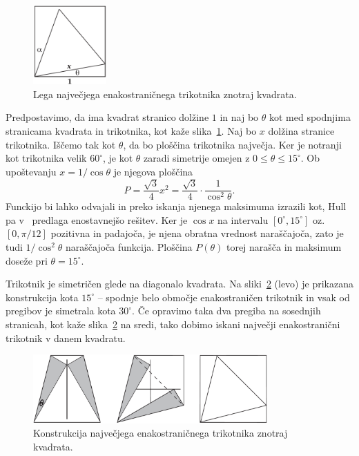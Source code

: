 \begin{figure}[h]
    \centering
    \includegraphics[width=0.25\textwidth]{images/n-kotniki/trik_enak_max1.png}
    \caption[Lega največjega enakostraničnega trikotnika znotraj kvadrata]{Lega največjega enakostraničnega trikotnika znotraj kvadrata.}
    \label{fig:trik_enak_max1}
\end{figure}

Predpostavimo, da ima kvadrat stranico dolžine $1$ in naj bo $\theta$ kot med spodnjima stranicama kvadrata in trikotnika, kot kaže slika~\ref{fig:trik_enak_max1}. Naj bo $x$ dolžina stranice trikotnika. Iščemo tak kot $\theta$, da bo ploščina trikotnika največja. Ker je notranji kot trikotnika velik $60^\circ$, je kot $\theta$ zaradi simetrije omejen z $0 \leq \theta \leq 15^\circ$. Ob upoštevanju $x = 1/ \cos \theta$ je njegova ploščina
$$ P = \frac{\sqrt{3}}{4} x^2 = \frac{\sqrt{3}}{4} \cdot \frac{1}{\cos^2 \theta}. $$
Funckijo bi lahko odvajali in preko iskanja njenega maksimuma izrazili kot, Hull pa v~\cite[str.\ 11]{hull2013} predlaga enostavnejšo rešitev. Ker je $\cos x$ na intervalu $[0^\circ, 15^\circ]$ oz.\ $[0, \pi/12]$ pozitivna in padajoča, je njena obratna vrednost naraščajoča, zato je tudi $1/\cos^2\theta$ naraščajoča funkcija. Ploščina $P(\theta)$ torej narašča in maksimum doseže pri $\theta = 15^\circ$.

Trikotnik je simetričen glede na diagonalo kvadrata. Na sliki~\ref{fig:trik_enak_max2} (levo) je prikazana konstrukcija kota $15^\circ$ -- spodnje belo območje enakostraničen trikotnik in vsak od pregibov je simetrala kota $30^\circ$. Če opravimo taka dva pregiba na sosednjih stranicah, kot kaže slika~\ref{fig:trik_enak_max2} na sredi, tako dobimo iskani največji enakostranični trikotnik v danem kvadratu.

\begin{figure}[h]
    \centering
    \includegraphics[width=0.8\textwidth]{images/n-kotniki/trik_enak_max2.png}
    \caption[Konstrukcija največjega enakostraničnega trikotnika znotraj kvadrata]{Konstrukcija največjega enakostraničnega trikotnika znotraj kvadrata.}
    \label{fig:trik_enak_max2}
\end{figure}

